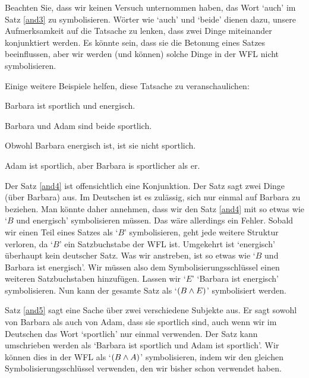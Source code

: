 

Beachten Sie, dass wir keinen Versuch unternommen haben, das Wort `auch' im Satz \ref{and3} zu symbolisieren. Wörter wie `auch' und `beide' dienen dazu, unsere Aufmerksamkeit auf die Tatsache zu lenken, dass zwei Dinge miteinander konjunktiert werden. Es könnte sein, dass sie die Betonung eines Satzes beeinflussen, aber wir werden (und können) solche Dinge in der WFL nicht symbolisieren.

Einige weitere Beispiele helfen, diese Tatsache zu veranschaulichen:
	\begin{earg}
		\item[\ex{and4}] Barbara ist sportlich und energisch.
		\item[\ex{and5}] Barbara und Adam sind beide sportlich.
		\item[\ex{and6}] Obwohl Barbara energisch ist, ist sie nicht sportlich.
		\item[\ex{and7}] Adam ist sportlich, aber Barbara is sportlicher als er.
	\end{earg}
Der Satz \ref{and4} ist offensichtlich eine Konjunktion. Der Satz sagt zwei Dinge (über Barbara) aus. Im Deutschen ist es zulässig, sich nur einmal auf Barbara zu beziehen. Man könnte daher annehmen, dass wir den Satz \ref{and4} mit so etwas wie `$B$ und energisch' symbolisieren müssen. Das wäre allerdings ein Fehler. Sobald wir einen Teil eines Satzes als `$B$' symbolisieren, geht jede weitere Struktur verloren, da `$B$' ein Satzbuchstabe der WFL ist. Umgekehrt ist `energisch' überhaupt kein deutscher Satz. Was wir anstreben, ist so etwas wie `$B$ und Barbara ist energisch'. Wir müssen also dem Symbolisierungsschlüssel einen weiteren Satzbuchstaben hinzufügen. Lassen wir `$E$' `Barbara ist energisch' symbolisieren. Nun kann der gesamte Satz als `$(B \wedge E)$' symbolisiert werden.

Satz \ref{and5} sagt eine Sache über zwei verschiedene Subjekte aus. Er sagt sowohl von Barbara als auch von Adam, dass sie sportlich sind, auch wenn wir im Deutschen das Wort `sportlich' nur einmal verwenden. Der Satz kann umschrieben werden als `Barbara ist sportlich und Adam ist sportlich'. Wir können dies in der WFL als `$(B \wedge A)$' symbolisieren, indem wir den gleichen Symbolisierungsschlüssel verwenden, den wir bisher schon verwendet haben.


